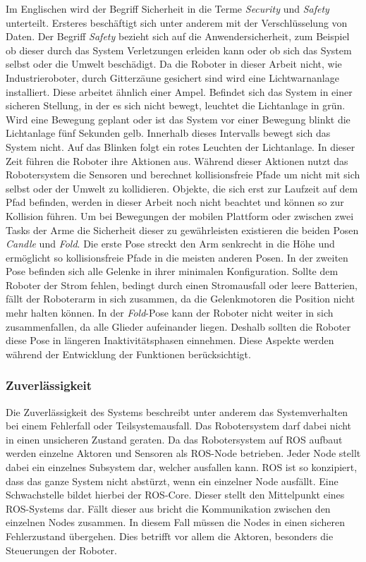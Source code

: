 Im Englischen wird der Begriff Sicherheit in die Terme \textit{Security} und \textit{Safety} unterteilt. Ersteres beschäftigt sich unter anderem mit der Verschlüsselung von Daten. Der Begriff \textit{Safety} bezieht sich auf die Anwendersicherheit, zum Beispiel ob dieser durch das System Verletzungen erleiden kann oder ob sich das System selbst oder die Umwelt beschädigt. Da die Roboter in dieser Arbeit nicht, wie Industrieroboter, durch Gitterzäune gesichert sind wird eine Lichtwarnanlage installiert. Diese arbeitet ähnlich einer Ampel. Befindet sich das System in einer sicheren Stellung, in der es sich nicht bewegt, leuchtet die Lichtanlage in grün. Wird eine Bewegung geplant oder ist das System vor einer Bewegung blinkt die Lichtanlage fünf Sekunden gelb. Innerhalb dieses Intervalls bewegt sich das System nicht. Auf das Blinken folgt ein rotes Leuchten der Lichtanlage. In dieser Zeit führen die Roboter ihre Aktionen aus. Während dieser Aktionen nutzt das Robotersystem die Sensoren und berechnet kollisionsfreie Pfade um nicht mit sich selbst oder der Umwelt zu kollidieren. Objekte, die sich erst zur Laufzeit auf dem Pfad befinden, werden in dieser Arbeit noch nicht beachtet und können so zur Kollision führen. Um bei Bewegungen der mobilen Plattform oder zwischen zwei Tasks der Arme die Sicherheit dieser zu gewährleisten existieren die beiden Posen \textit{Candle} und \textit{Fold}. Die erste Pose streckt den Arm senkrecht in die Höhe und ermöglicht so kollisionsfreie Pfade in die meisten anderen Posen. In der zweiten Pose befinden sich alle Gelenke in ihrer minimalen Konfiguration. Sollte dem Roboter der Strom fehlen, bedingt durch einen Stromausfall oder leere Batterien, fällt der Roboterarm in sich zusammen, da die Gelenkmotoren die Position nicht mehr halten können. In der \textit{Fold}-Pose kann der Roboter nicht weiter in sich zusammenfallen, da alle Glieder aufeinander liegen. Deshalb sollten die Roboter diese Pose in längeren Inaktivitätsphasen einnehmen. Diese Aspekte werden während der Entwicklung der Funktionen berücksichtigt.

\subsubsection{Zuverlässigkeit}
Die Zuverlässigkeit des Systems beschreibt unter anderem das Systemverhalten bei einem Fehlerfall oder Teilsystemausfall. Das Robotersystem darf dabei nicht in einen unsicheren Zustand geraten. Da das Robotersystem auf ROS aufbaut werden einzelne Aktoren und Sensoren als ROS-Node betrieben. Jeder Node stellt dabei ein einzelnes Subsystem dar, welcher ausfallen kann. ROS ist so konzipiert, dass das ganze System nicht abstürzt, wenn ein einzelner Node ausfällt. Eine Schwachstelle bildet hierbei der ROS-Core. Dieser stellt den Mittelpunkt eines ROS-Systems dar. Fällt dieser aus bricht die Kommunikation zwischen den einzelnen Nodes zusammen. In diesem Fall müssen die Nodes in einen sicheren Fehlerzustand übergehen. Dies betrifft vor allem die Aktoren, besonders die Steuerungen der Roboter. 


